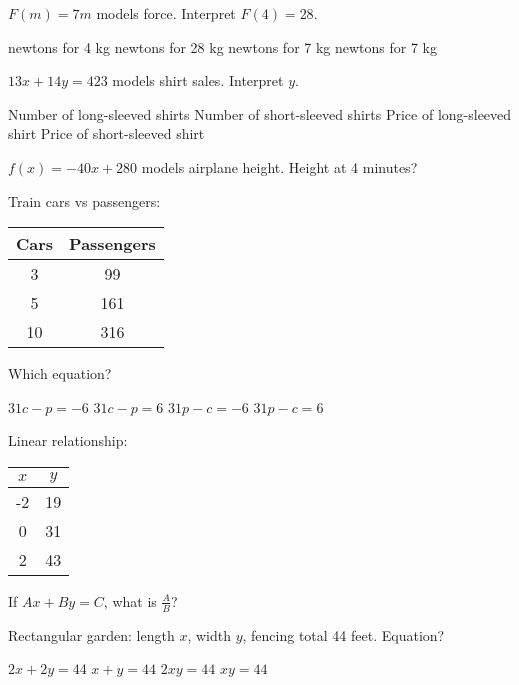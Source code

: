 \documentclass[12pt]{exam}
\begin{document}
\begin{questions}
\begin{center}
\end{center}

\question $F(m) = 7m$ models force. Interpret $F(4) = 28$.
\begin{choices}
 newtons for 4 kg
 newtons for 28 kg
 newtons for 7 kg
 newtons for 7 kg
\end{choices}

\question $13x + 14y = 423$ models shirt sales. Interpret $y$.
\begin{choices}
\choice Number of long-sleeved shirts
\choice Number of short-sleeved shirts
\choice Price of long-sleeved shirt
\choice Price of short-sleeved shirt
\end{choices}

\question $f(x) = -40x + 280$ models airplane height. Height at 4 minutes?
\begin{choices}
\end{choices}

\question Train cars vs passengers:
\begin{center}
\begin{tabular}{|c|c|}
\hline
Cars & Passengers \\
\hline
3 & 99 \\
5 & 161 \\
10 & 316 \\
\hline
\end{tabular}
\end{center}
Which equation?
\begin{choices}
\choice $31c - p = -6$
\choice $31c - p = 6$
\choice $31p - c = -6$
\choice $31p - c = 6$
\end{choices}

\question Linear relationship:
\begin{center}
\begin{tabular}{|c|c|}
\hline
$x$ & $y$ \\
\hline
-2 & 19 \\
0 & 31 \\
2 & 43 \\
\hline
\end{tabular}
\end{center}
If $Ax + By = C$, what is $\frac{A}{B}$?

\question Rectangular garden: length $x$, width $y$, fencing total 44 feet. Equation?
\begin{choices}
\choice $2x + 2y = 44$
\choice $x + y = 44$
\choice $2xy = 44$
\choice $xy = 44$
\end{choices}


\end{questions}
\end{document}
